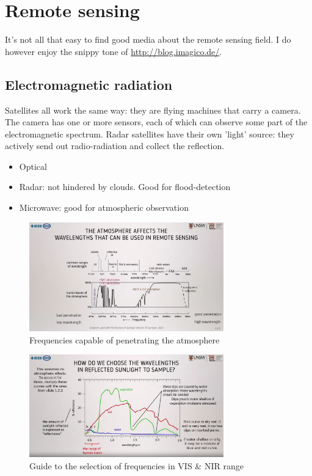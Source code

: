 
\section{Remote sensing}

It's not all that easy to find good media about the remote sensing field. I do however enjoy the snippy tone of \href{http://blog.imagico.de/}{http://blog.imagico.de/}.


\subsection{Electromagnetic radiation}
Satellites all work the same way: they are flying machines that carry a camera. The camera has one or more sensors, each of which can observe some part of the electromagnetic spectrum.
Radar satellites have their own 'light' source: they actively send out radio-radiation and collect the reflection.

\begin{itemize}
    \item Optical
    \item Radar: not hindered by clouds. Good for flood-detection
    \item Microwave: good for atmospheric observation
\end{itemize}


\begin{figure}[H]
    \caption{Frequencies capable of penetrating the atmosphere}
    \centering
      \includegraphics[width=0.75\textwidth]{images/rs_atmospheric_absorption.png}
\end{figure}

\begin{figure}[H]
    \caption{Guide to the selection of frequencies in VIS \& NIR range}
    \centering
      \includegraphics[width=0.75\textwidth]{images/rs_vis_nir_curves.png}
\end{figure}

